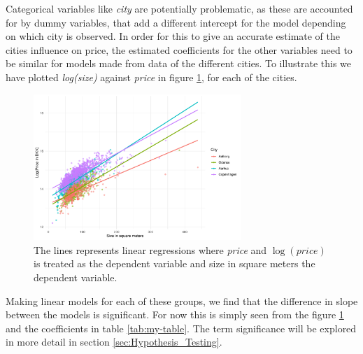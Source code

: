 Categorical variables like \textit{city} are potentially problematic, as these are accounted for by dummy variables, that add a different intercept for the model depending on which city is observed.
In order for this to give an accurate estimate of the cities influence on price, the estimated coefficients for the other variables need to be similar for models made from data of the different cities. 
To illustrate this we have plotted \textit{log(size)} against \textit{price} in figure \ref{fig:Forskellig_haeldning}, for each of the cities.
\begin{figure}[H]
    \centering
    \includegraphics[width = 0.7\textwidth]{figures/Nanna/Forskellig_haeldning.pdf}
    \caption{The lines represents linear regressions where \textit{price} and $\log(price)$ is treated as the dependent variable and size in square meters the dependent variable.}
    \label{fig:Forskellig_haeldning}
\end{figure}
Making linear models for each of these groups, we find that the difference in slope between the models is significant.
For now this is simply seen from the figure \ref{fig:Forskellig_haeldning} and the coefficients in table \ref{tab:my-table}.
The term significance will be explored in more detail in section \ref{sec:Hypothesis_Testing}. 


